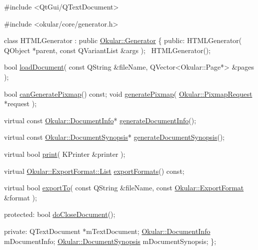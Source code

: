 \begin{DoxyCode}
\textcolor{preprocessor}{#include <QtGui/QTextDocument>}

\textcolor{preprocessor}{#include <okular/core/generator.h>}

\textcolor{keyword}{class }HTMLGenerator : \textcolor{keyword}{public} \hyperlink{classOkular_1_1Generator}{Okular::Generator}
\{
    \textcolor{keyword}{public}:
        HTMLGenerator( QObject *parent, \textcolor{keyword}{const} QVariantList &args );
        ~HTMLGenerator();

        \textcolor{keywordtype}{bool} \hyperlink{classOkular_1_1Generator_a388b47328a5297d53cdbdc6fcf074ee3}{loadDocument}( \textcolor{keyword}{const} QString &fileName, QVector<Okular::Page*> &pages );

        \textcolor{keywordtype}{bool} \hyperlink{classOkular_1_1Generator_abbf00927221e2d2b2b71101f2b7f5732}{canGeneratePixmap}() \textcolor{keyword}{const};
        \textcolor{keywordtype}{void} \hyperlink{classOkular_1_1Generator_a198cdcd9c27b179562c935342fd457b6}{generatePixmap}( \hyperlink{classOkular_1_1PixmapRequest}{Okular::PixmapRequest} *request );

        \textcolor{keyword}{virtual} \textcolor{keyword}{const} \hyperlink{classOkular_1_1DocumentInfo}{Okular::DocumentInfo}* 
      \hyperlink{classOkular_1_1Generator_a9993dd0a2415499e23d8394e7a447e98}{generateDocumentInfo}();

        \textcolor{keyword}{virtual} \textcolor{keyword}{const} \hyperlink{classOkular_1_1DocumentSynopsis}{Okular::DocumentSynopsis}* 
      \hyperlink{classOkular_1_1Generator_a1f8b31c19d7a5101cadf3fe3186ab0f1}{generateDocumentSynopsis}();

        \textcolor{keyword}{virtual} \textcolor{keywordtype}{bool} \hyperlink{classOkular_1_1Generator_aa786d406a1b0db6679a3bc62bbe2dc82}{print}( KPrinter &printer );

        \textcolor{keyword}{virtual} \hyperlink{classQList}{Okular::ExportFormat::List} 
      \hyperlink{classOkular_1_1Generator_a74280fb193319daab955feac694123ac}{exportFormats}() \textcolor{keyword}{const};

        \textcolor{keyword}{virtual} \textcolor{keywordtype}{bool} \hyperlink{classOkular_1_1Generator_a9e78f37aafbfdaf04f76f4163c27aa5e}{exportTo}( \textcolor{keyword}{const} QString &fileName, \textcolor{keyword}{const} 
      \hyperlink{classOkular_1_1ExportFormat}{Okular::ExportFormat} &format );

    \textcolor{keyword}{protected}:
        \textcolor{keywordtype}{bool} \hyperlink{classOkular_1_1Generator_ad3f1dcb98f3bd87c87ad0e91ecf4a6d7}{doCloseDocument}();

    \textcolor{keyword}{private}:
        QTextDocument *mTextDocument;
        \hyperlink{classOkular_1_1DocumentInfo}{Okular::DocumentInfo} mDocumentInfo;
        \hyperlink{classOkular_1_1DocumentSynopsis}{Okular::DocumentSynopsis} mDocumentSynopsis;
\};
\end{DoxyCode}


